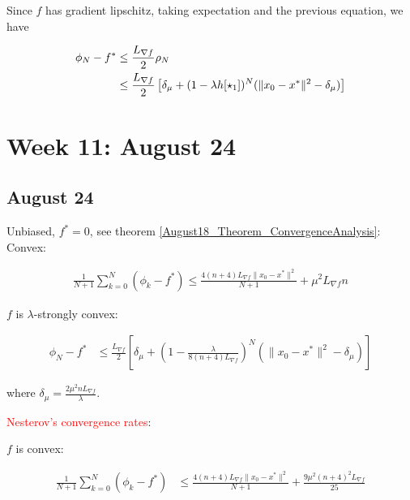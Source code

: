 \documentclass{article}
\begin{document}
Since $f$ has gradient lipschitz, taking expectation and the previous equation, we have 

\begin{align}
\phi_N - f^* & \leq \frac{L_{\nabla f}}{2}\rho_N \notag  \\ & \leq \frac{L_{\nabla f}}{2}\left[\delta_{\mu} + (1 - \lambda h [\star_1])^N(\|x_0 - x^*\|^2 - \delta_{\mu})\right] \label{August24_ConvergenceRate_Bound1}
\end{align}


\section{Week 11: August 24}

\subsection{August 24}

Unbiased, $f^* = 0$, see theorem \ref{August18_Theorem_ConvergenceAnalysis}: 
Convex: 

\begin{align*}
\frac{1}{N+1}\sum_{k=0}^N(\phi_k - f^*) \leq \frac{4(n+4)L_{\nabla f}\|x_0-x^*\|^2}{N+1} + \mu^2L_{\nabla f}n
\end{align*}

$f$ is $\lambda$-strongly convex: 

\begin{align*}
\phi_N - f^* & \leq \frac{L_{\nabla f}}{2}\left[\delta_{\mu} + \left(1- \frac{\lambda}{8(n+4)L_{\nabla f}}\right)^N(\|x_0 - x^*\|^2 - \delta_{\mu})\right]
\end{align*}

where $\delta_{\mu} = \frac{2\mu^2 n L_{\nabla f}}{\lambda}$. \newline 

\textcolor{red}{Nesterov's convergence rates}: \newline 

$f$ is convex: 

\begin{align*}
\frac{1}{N+1}\sum_{k=0}^{N}(\phi_k - f^*) & \leq \frac{4(n+4)L_{\nabla f}\|x_0 - x^*\|^2}{N+1} + \frac{9\mu^2 (n+4)^2 L_{\nabla f}}{25}
\end{align*}
\end{document}
